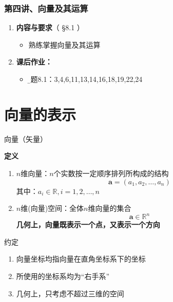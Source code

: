 
\begin{frame}
	\frametitle{第四讲、向量及其运算}
	\linespread{1.5}
	\begin{enumerate}
	  \item {\bf 内容与要求}{\color{blue}（ \S8.1 ）}
	  \begin{itemize}
	    \item 熟练掌握向量及其运算
	  \vspace{1em}
	  \end{itemize}
	  \item {\bf  课后作业：}
	  \begin{itemize}
	    \item {\b 习题8.1：3,4,6,11,13,14,16,18,19,22,24}
	  \end{itemize}
	\end{enumerate}
\end{frame}

\section{向量的表示}

\begin{frame}{向量（矢量）}
	\linespread{1.2}\pause 
	\begin{block}{{\bf 定义} \hfill}
		\begin{enumerate}
		  \item {\bb $n$维向量：}$n$个实数按一定顺序排列所构成的结构
		  $$\bm{a}=(a_1,a_2,\ldots,a_n)$$
		  其中：$a_i\in\mathbb{R},i=1,2,\ldots,n$\pause 
		  \item {\bb $n$维(向量)空间：}全体$n$维向量的集合
		  $$\bm{a}\in\mathbb{R}^n$$\pause 
		  \alert{\bf 几何上，向量既表示一个点，又表示一个方向}
		\end{enumerate}
	\end{block}
\end{frame}

\begin{frame}{约定}
	\linespread{2}
	\begin{enumerate}\pause 
	  \item \alert{向量坐标均指向量在直角坐标系下的坐标}\pause 
	  \item \alert{所使用的坐标系均为“右手系”}\pause 
	  \item \alert{几何上，只考虑不超过三维的空间}
	\end{enumerate}
\end{frame}

